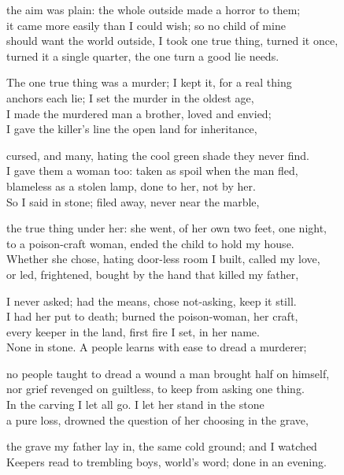 \begin{founder}
the aim was plain: the whole outside made a horror to them;\\
it came more easily than I could wish; so no child of mine\\
should want the world outside, I took one true thing, turned it once,\\
turned it a single quarter, the one turn a good lie needs.\\
\medskip

The one true thing was a murder; I kept it, for a real thing\\
anchors each lie; I set the murder in the oldest age,\\
I made the murdered man a brother, loved and envied;\\
I gave the killer's line the open land for inheritance,\\
\medskip

cursed, and many, hating the cool green shade they never find.\\
I gave them a woman too: taken as spoil when the man fled,\\
blameless as a stolen lamp, done to her, not by her.\\
So I said in stone; filed away, never near the marble,\\
\medskip

the true thing under her: she went, of her own two feet, one night,\\
to a poison-craft woman, ended the child to hold my house.\\
Whether she chose, hating door-less room I built, called my love,\\
or led, frightened, bought by the hand that killed my father,\\
\medskip

I never asked; had the means, chose not-asking, keep it still.\\
I had her put to death; burned the poison-woman, her craft,\\
every keeper in the land, first fire I set, in her name.\\
None in stone. A people learns with ease to dread a murderer;\\
\medskip

no people taught to dread a wound a man brought half on himself,\\
nor grief revenged on guiltless, to keep from asking one thing.\\
In the carving I let all go. I let her stand in the stone\\
a pure loss, drowned the question of her choosing in the grave,\\
\medskip

the grave my father lay in, the same cold ground; and I watched\\
Keepers read to trembling boys, world's word; done in an evening.
\end{founder}

